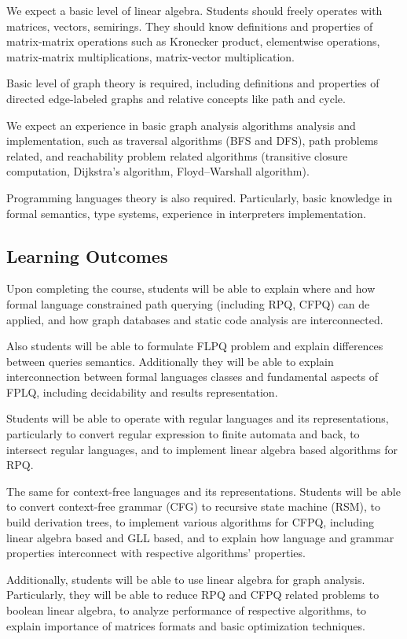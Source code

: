 \documentclass[sigconf]{acmart}
\begin{document}
We expect a basic level of linear algebra.
Students should freely operates with matrices, vectors, semirings.
They should know definitions and properties of matrix-matrix operations such as Kronecker product, elementwise operations, matrix-matrix multiplications, matrix-vector multiplication. 

Basic level of graph theory is required, including definitions and properties of directed edge-labeled graphs and relative concepts like path and cycle.

We expect an experience in basic graph analysis algorithms analysis and implementation, such as traversal algorithms (BFS and DFS), path problems related, and reachability problem related algorithms (transitive closure computation, Dijkstra's algorithm, Floyd–Warshall algorithm).

Programming languages theory is also required. 
Particularly, basic knowledge in formal semantics, type systems, experience in interpreters implementation.

\subsection{Learning Outcomes}

Upon completing the course, students will be able to explain where and how formal language constrained path querying (including RPQ, CFPQ) can de applied, and how graph databases and static code analysis are interconnected.

Also students will be able to formulate FLPQ problem and explain differences between queries semantics.
Additionally they will be able to explain interconnection between formal languages classes and fundamental aspects of FPLQ, including decidability and results representation.

Students will be able to operate with regular languages and its representations, particularly to convert regular expression to finite automata and back, to intersect regular languages, and to implement linear algebra based algorithms for RPQ. 

The same for context-free languages and its representations. 
Students will be able to convert context-free grammar (CFG) to recursive state machine (RSM), to build derivation trees, to implement various algorithms for CFPQ, including linear algebra based and GLL based, and to explain how language and grammar properties interconnect with respective algorithms' properties. 

Additionally, students will be able to use linear algebra for graph analysis. 
Particularly, they will be able to reduce RPQ and CFPQ related problems to boolean linear algebra, to analyze performance of respective algorithms, to explain importance of matrices formats and basic optimization techniques.
\end{document}
